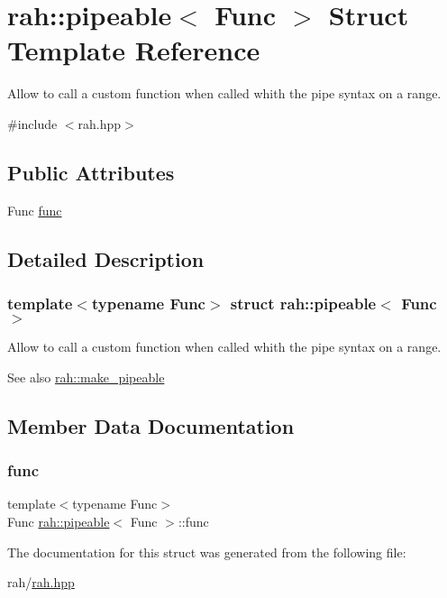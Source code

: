\hypertarget{structrah_1_1pipeable}{}\section{rah\+::pipeable$<$ Func $>$ Struct Template Reference}
\label{structrah_1_1pipeable}


Allow to call a custom function when called whith the \textquotesingle{}pipe\textquotesingle{} syntax on a range.  




{\ttfamily \#include $<$rah.\+hpp$>$}

\subsection*{Public Attributes}
\begin{DoxyCompactItemize}
\item 
Func \mbox{\hyperlink{structrah_1_1pipeable_a2d26d18babf4edf2303bdb8b9a9dd165}{func}}
\end{DoxyCompactItemize}


\subsection{Detailed Description}
\subsubsection*{template$<$typename Func$>$\newline
struct rah\+::pipeable$<$ Func $>$}

Allow to call a custom function when called whith the \textquotesingle{}pipe\textquotesingle{} syntax on a range. 

\begin{DoxySeeAlso}{See also}
\mbox{\hyperlink{namespacerah_a274b78c4c0af5dd58ce280f02223fb55}{rah\+::make\+\_\+pipeable}} 
\end{DoxySeeAlso}


\subsection{Member Data Documentation}
\mbox{\label{structrah_1_1pipeable_a2d26d18babf4edf2303bdb8b9a9dd165}} 
\subsubsection{\texorpdfstring{func}{func}}
{\footnotesize\ttfamily template$<$typename Func$>$ \\
Func \mbox{\hyperlink{structrah_1_1pipeable}{rah\+::pipeable}}$<$ Func $>$\+::func}



The documentation for this struct was generated from the following file\+:\begin{DoxyCompactItemize}
\item 
rah/\mbox{\hyperlink{rah_8hpp}{rah.\+hpp}}\end{DoxyCompactItemize}

